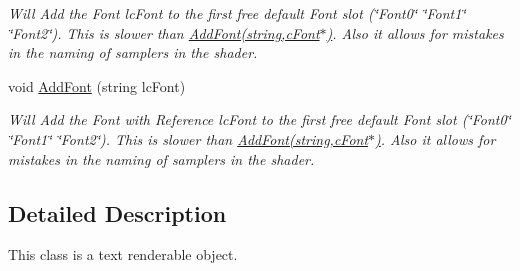 \begin{DoxyCompactItemize}
\begin{DoxyCompactList}\small\item\em Will Add the Font lcFont to the first free default Font slot (\char`\"{}Font0\char`\"{} \char`\"{}Font1\char`\"{} \char`\"{}Font2\char`\"{}). This is slower than \hyperlink{classc_text_ac44668d1b105b37f62e5386ce9c62969}{AddFont(string,cFont$\ast$)}. Also it allows for mistakes in the naming of samplers in the shader. \end{DoxyCompactList}\item 
\hypertarget{classc_text_aa9e8247389d16ace03973ae34cca343f}{
void \hyperlink{classc_text_aa9e8247389d16ace03973ae34cca343f}{AddFont} (string lcFont)}
\label{classc_text_aa9e8247389d16ace03973ae34cca343f}

\begin{DoxyCompactList}\small\item\em Will Add the Font with Reference lcFont to the first free default Font slot (\char`\"{}Font0\char`\"{} \char`\"{}Font1\char`\"{} \char`\"{}Font2\char`\"{}). This is slower than \hyperlink{classc_text_ac44668d1b105b37f62e5386ce9c62969}{AddFont(string,cFont$\ast$)}. Also it allows for mistakes in the naming of samplers in the shader. \end{DoxyCompactList}\end{DoxyCompactItemize}


\subsection{Detailed Description}
This class is a text renderable object. 
